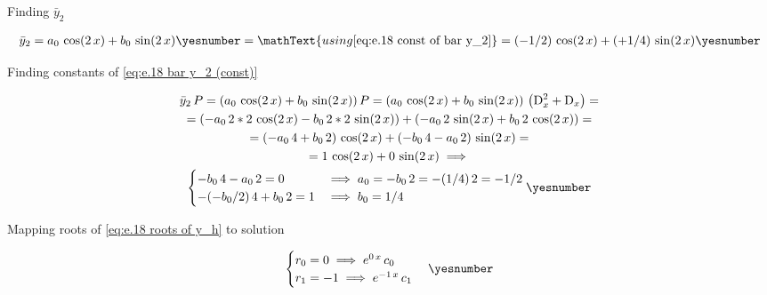 \documentclass["AM3C-Slides_annotations.tex"]{subfiles}
\begin{document}
\begin{exampleBox}


  Finding \(\bar{y}_2\)
  \begin{tcolorbox}
    \begin{gather*}
      \bar{y}_2
      = a_0\,\cos(2\,x)
      + b_0\,\sin(2\,x)
      \yesnumber\label{eq:e.18 bar y_2 (const)}
      = \mathText{using \eqref{eq:e.18 const of bar y_2}}
      = (-1/2)\,\cos(2\,x)
      + (+1/4)\,\sin(2\,x)
      \yesnumber\label{eq:e.18 bar y_2}
    \end{gather*}
  \end{tcolorbox}

  Finding constants of \eqref{eq:e.18 bar y_2 (const)}
  \begin{tcolorbox}
    \begin{gather*}
      \bar{y}_2\,P
      = (
        a_0\,\cos(2\,x)
        + b_0\,\sin(2\,x)
      )
      \,P
      = (
        a_0\,\cos(2\,x)
        + b_0\,\sin(2\,x)
      )
      \,\left(
        \mdif[2]{x} + \mdif{x}
      \right)
      = \\
      = (
        - a_0\,2*2\,\cos(2\,x)
        - b_0\,2*2\,\sin(2\,x)
      )
      + (
        - a_0\,2\,\sin(2\,x)
        + b_0\,2\,\cos(2\,x)
      )
      = \\
      =
      (
        - a_0\,4
        + b_0\,2
      )
      \,\cos(2\,x)
      + (
        - b_0\,4
        - a_0\,2
      )
      \,\sin(2\,x)
      = \\
      = 1\,\cos(2\,x)
      + 0\,\sin(2\,x)
      \implies \\
      \begin{cases}
        -b_0\,4-a_0\,2 = 0
        & \implies
        a_0 = -b_0\,2
        = -(1/4)\,2 = -1/2
        \\
        -(-b_0/2)\,4+b_0\,2 = 1
        & \implies
        b_0 = 1/4
      \end{cases}
      \yesnumber\label{eq:e.18 const of bar y_2}
    \end{gather*}
  \end{tcolorbox}

  Mapping roots of \eqref{eq:e.18 roots of y_h} to solution
  \begin{tcolorbox}
    \begin{gather*}
      \begin{cases}
        r_0 = 0
        \implies
        e^{0\,x}\,c_0
        \\
        r_1 = -1
        \implies
        e^{-1\,x}\,c_1
      \end{cases}
      \yesnumber\label{eq:e.18 mapped roots for y_h}
    \end{gather*}
  \end{tcolorbox}


\end{exampleBox}
\end{document}
